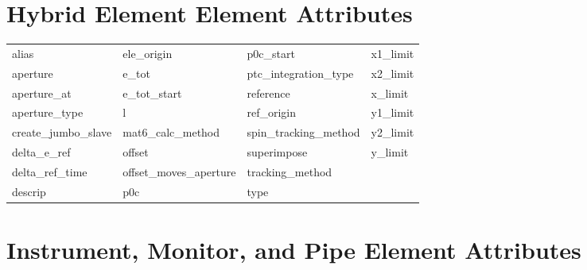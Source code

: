  \vfill
 
 \section{Hybrid Element Element Attributes}
 \label{s:list.hybrid}
 
 \begin{tabular}{llll} \toprule
alias                       & ele_origin                  & p0c_start                   & x1_limit                    \\
aperture                    & e_tot                       & ptc_integration_type        & x2_limit                    \\
aperture_at                 & e_tot_start                 & reference                   & x_limit                     \\
aperture_type               & l                           & ref_origin                  & y1_limit                    \\
create_jumbo_slave          & mat6_calc_method            & spin_tracking_method        & y2_limit                    \\
delta_e_ref                 & offset                      & superimpose                 & y_limit                     \\
delta_ref_time              & offset_moves_aperture       & tracking_method             &                             \\
descrip                     & p0c                         & type                        &                             \\
 \bottomrule
 \end{tabular}
 \vfill
 
 \section{Instrument, Monitor, and Pipe Element Attributes}
 \label{s:list.instrument}
 
